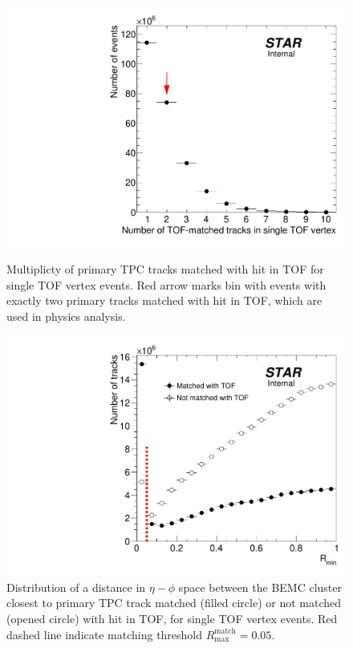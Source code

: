 \begin{figure}[t!]%
\centering%
\begin{minipage}{.4725\textwidth}%
  \centering%
  \includegraphics[width=\linewidth]{graphics/eventSelection/TpcTracks/NumberOfTofTracksInSingleTofVertex.pdf}%
  \caption[Multiplicty of primary TPC tracks matched with hit in TOF for single TOF vertex events]{Multiplicty of primary TPC tracks matched with hit in TOF for single TOF vertex events. Red arrow marks bin with events with exactly two primary tracks matched with hit in TOF, which are used in physics analysis.\newline}\label{fig:NumberOfTofTracksInSingleTofVertex}
\end{minipage}%
\quad\quad%
\begin{minipage}{.4725\textwidth}%
  \centering
  \includegraphics[width=\linewidth]{graphics/eventSelection/TpcTracks/Rmin.pdf}%
  \caption[Distribution of a distance in $\eta-\phi$ space between the BEMC cluster closest to primary TPC track ($R_{\text{min}}$)]{Distribution of a distance in $\eta-\phi$ space between the BEMC cluster closest to primary TPC track matched (filled circle) or not matched (opened circle) with hit in TOF, for single TOF vertex events. Red dashed line indicate matching threshold $R^{\text{match}}_{\text{max}} = 0.05$.}\label{fig:Rmin} %
\end{minipage}%
\end{figure}%

